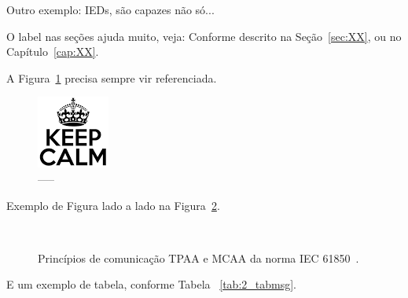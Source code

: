 Outro exemplo:  \acp{IED}, são capazes não só...

O label nas seções ajuda muito, veja: Conforme descrito na Seção~\ref{sec:XX}, ou no Capítulo~\ref{cap:XX}.

A Figura~\ref{fig:2_juncaomodelodados} precisa sempre vir referenciada.

\begin{figure}[ht]
	\begin{center}
		\centering
		\includegraphics[width=0.5\linewidth]{figuras/images}
	\end{center}	
	\caption{-----}
	\label{fig:2_juncaomodelodados}
\end{figure}

Exemplo de Figura lado a lado na Figura~\ref{fig:2_principioscom}.

\begin{figure}[ht]
\begin{center}
\mbox{
	\hspace{0.2cm}
	}
\end{center}
\caption{Princípios de comunicação TPAA e MCAA da norma IEC 61850~\cite{fangxing2010}.}
\label{fig:2_principioscom}
\end{figure}

E um exemplo de tabela, conforme Tabela ~\ref{tab:2_tabmsg}.

